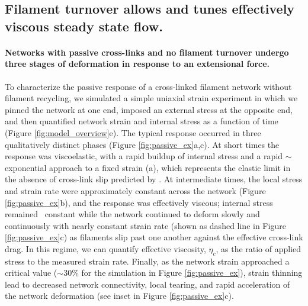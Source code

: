 \documentclass[10pt,letterpaper]{article}
\begin{document}
\subsection*{Filament turnover allows and tunes effectively viscous steady state flow.}
 
\paragraph{Networks with passive cross-links and no filament turnover undergo three stages of deformation in response to an extensional force.} 

To characterize the passive response of a cross-linked filament network without filament recycling, we simulated a simple uniaxial strain experiment in which we pinned the network at one end, imposed an external stress at the opposite end, and then quantified network strain and internal stress as a function of time (Figure \ref{fig:model_overview}e). The typical response occurred in three qualitatively distinct phases (Figure \ref{fig:passive_ex}a,c). At short times the response was viscoelastic, with a rapid buildup of internal stress and a rapid $\sim$exponential approach to a fixed strain (a), which represents the elastic limit in the absence of cross-link slip predicted by \cite{theo_hlm}. At intermediate times, the local stress and strain rate were approximately constant across the network (Figure \ref{fig:passive_ex}b), and the response was effectively viscous; internal stress remained ~constant while the network continued to deform slowly and continuously with nearly constant strain rate (shown as dashed line in Figure \ref{fig:passive_ex}c) as filaments slip past one another against the effective cross-link drag. In this regime, we can quantify effective viscosity, $\eta_c$,  as the ratio of applied stress to the measured strain rate. Finally, as the network strain approached a critical value ($\sim 30\%$ for the simulation in Figure \ref{fig:passive_ex}), strain thinning lead to decreased network connectivity, local tearing, and rapid acceleration of the network deformation (see inset in Figure \ref{fig:passive_ex}c).
\end{document}
